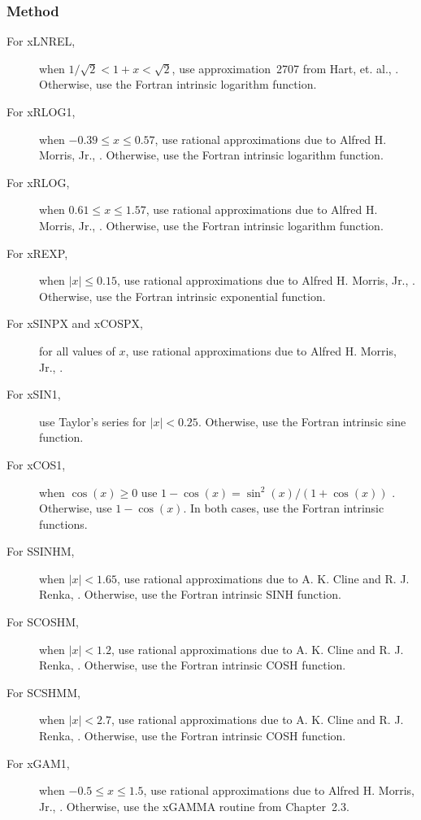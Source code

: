 \documentclass[twoside]{MATH77}
\begin{document}
\subsubsection{Method}
\begin{description}
\item[For xLNREL,] when $1/\sqrt 2 < 1+x < \sqrt 2$, use approximation~2707 from
Hart, et. al., \cite{Hart:1968:CA}. Otherwise, use the Fortran intrinsic logarithm
function.

\item[For xRLOG1,] when $-0.39 \leq  x \leq  0.57$, use
rational approximations due to Alfred H. Morris, Jr., \cite{ahm:lib}. Otherwise,
use the Fortran intrinsic logarithm function.

\item[For xRLOG,] when $0.61 \leq  x \leq  1.57$, use rational
approximations due to Alfred H. Morris, Jr., \cite{ahm:lib}. Otherwise, use the
Fortran intrinsic logarithm function.

\item[For xREXP,] when $|x| \leq  0.15$, use rational approximations due
to Alfred H. Morris, Jr., \cite{ahm:lib}. Otherwise, use the Fortran intrinsic
exponential function.

\item[For xSINPX and xCOSPX,] for all values of $x$, use rational approximations
due to Alfred H. Morris, Jr., \cite{ahm:lib}.

\item[For xSIN1,] use Taylor's series for $|x| < 0.25$. Otherwise, use the Fortran
intrinsic sine function.

\item[For xCOS1,] when $\cos (x) \geq 0$ use $1-\cos (x) = \sin ^2(x) / (1+\cos (x))$%
. Otherwise, use $1-\cos (x)$. In both cases, use the Fortran intrinsic
functions.

\item[For SSINHM,] when $|x| < 1.65$, use rational approximations due to A. K.
Cline and R. J. Renka, \cite{ahm:lib}. Otherwise, use the Fortran intrinsic SINH
function.

\item[For SCOSHM,] when $|x| < 1.2$, use rational approximations due to A. K. Cline
and R. J. Renka, \cite{ahm:lib}. Otherwise, use the Fortran intrinsic COSH function.

\item[For SCSHMM,] when $|x| < 2.7$, use rational approximations due to A. K. Cline
and R. J. Renka, \cite{ahm:lib}. Otherwise, use the Fortran intrinsic COSH function.

\item[For xGAM1,] when $-0.5 \leq  x \leq  1.5$,
use rational approximations due to Alfred H. Morris, Jr., \cite{ahm:lib}.
Otherwise, use the xGAMMA routine from Chapter~2.3.
\end{description}
\end{document}
